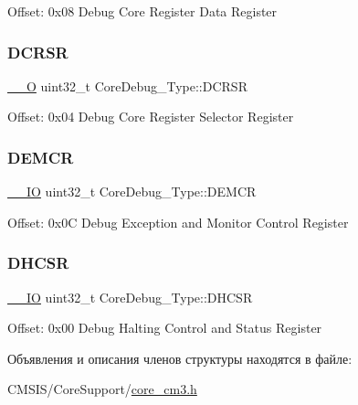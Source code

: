 Offset\+: 0x08 Debug Core Register Data Register ~\newline
 \mbox{\label{struct_core_debug___type_afefa84bce7497652353a1b76d405d983}} 
\subsubsection{\texorpdfstring{DCRSR}{DCRSR}}
{\footnotesize\ttfamily \mbox{\hyperlink{group___c_m_s_i_s___c_m3__core__definitions_ga7e25d9380f9ef903923964322e71f2f6}{\+\_\+\+\_\+O}} uint32\+\_\+t Core\+Debug\+\_\+\+Type\+::\+D\+C\+R\+SR}

Offset\+: 0x04 Debug Core Register Selector Register ~\newline
 \mbox{\label{struct_core_debug___type_a5cdd51dbe3ebb7041880714430edd52d}} 
\subsubsection{\texorpdfstring{DEMCR}{DEMCR}}
{\footnotesize\ttfamily \mbox{\hyperlink{group___c_m_s_i_s___c_m3__core__definitions_gaec43007d9998a0a0e01faede4133d6be}{\+\_\+\+\_\+\+IO}} uint32\+\_\+t Core\+Debug\+\_\+\+Type\+::\+D\+E\+M\+CR}

Offset\+: 0x0C Debug Exception and Monitor Control Register \mbox{\label{struct_core_debug___type_a25c14c022c73a725a1736e903431095d}} 
\subsubsection{\texorpdfstring{DHCSR}{DHCSR}}
{\footnotesize\ttfamily \mbox{\hyperlink{group___c_m_s_i_s___c_m3__core__definitions_gaec43007d9998a0a0e01faede4133d6be}{\+\_\+\+\_\+\+IO}} uint32\+\_\+t Core\+Debug\+\_\+\+Type\+::\+D\+H\+C\+SR}

Offset\+: 0x00 Debug Halting Control and Status Register ~\newline
 

Объявления и описания членов структуры находятся в файле\+:\begin{DoxyCompactItemize}
\item 
C\+M\+S\+I\+S/\+Core\+Support/\mbox{\hyperlink{core__cm3_8h}{core\+\_\+cm3.\+h}}\end{DoxyCompactItemize}
